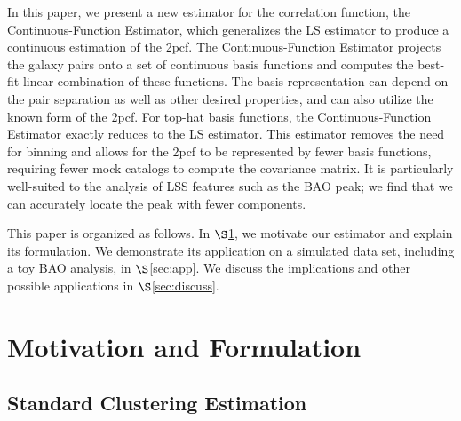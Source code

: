 \documentclass[modern]{aastex62}
\newcommand{\cf}{2pcf\xspace} %
\newcommand{\Est}{The Continuous-Function Estimator\xspace}
\newcommand{\est}{the Continuous-Function Estimator\xspace}
\newcommand{\LS}{LS\xspace}
\begin{document}
In this paper, we present a new estimator for the correlation function, \est, which generalizes the \LS estimator to produce a continuous estimation of the \cf. 
\Est projects the galaxy pairs onto a set of continuous basis functions and computes the best-fit linear combination of these functions.
The basis representation can depend on the pair separation as well as other desired properties, and can also utilize the known form of the \cf.
For top-hat basis functions, \est exactly reduces to the \LS estimator. 
This estimator removes the need for binning and allows for the \cf to be represented by fewer basis functions, requiring fewer mock catalogs to compute the covariance matrix.
It is particularly well-suited to the analysis of LSS features such as the BAO peak; we find that we can accurately locate the peak with fewer components.

This paper is organized as follows. 
In $\S$\ref{sec:motiv}, we motivate our estimator and explain its formulation.
We demonstrate its application on a simulated data set, including a toy BAO analysis, in $\S$\ref{sec:app}.
We discuss the implications and other possible applications in $\S$\ref{sec:discuss}. 

\section{Motivation and Formulation} 
\label{sec:motiv}

\subsection{Standard Clustering Estimation}
\end{document}
